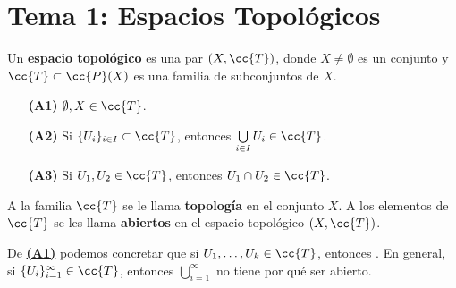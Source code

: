 
\chapter{Tema 1: Espacios Topológicos}

\begin{definicion}
    Un \textbf{espacio topológico} es una par $(X, \cc{T})$, donde $X \neq \emptyset$ es un conjunto y $\cc{T}\subset\cc{P}(X)$ es una familia de subconjuntos de $X$.

    \begin{enumerate}
        \item[\textbf{(\hypertarget{A1}{A1})}] $\emptyset, X \in \cc{T}$.
        \item[\textbf{(\hypertarget{A2}{A2})}] Si $\{U_i\}_{i\in I} \subset \cc{T}$, entonces $\bigcup\limits_{i\in I} U_i \in \cc{T}$.
        \item[\textbf{(\hypertarget{A3}{A3})}] Si $U_1, U_2 \in \cc{T}$, entonces $U_1 \cap U_2 \in \cc{T}$.
    \end{enumerate}

    A la familia $\cc{T}$ se le llama \textbf{topología} en el conjunto $X$. A los elementos de $\cc{T}$ se les llama \textbf{abiertos} en el espacio topológico $(X, \cc{T})$.
\end{definicion}

\vspace*{0.5cm}

\begin{observacion}
    De \hyperlink{A1}{\textbf{(A1)}} podemos concretar que si $U_1, \dots, U_k \in \cc{T}$, entonces .
    En general, si $\{U_i\}_{i=1}^{\infty}\in \cc{T}$, entonces $\bigcup\limits_{i=1}^{\infty}$ no tiene por qué ser abierto.
\end{observacion}

